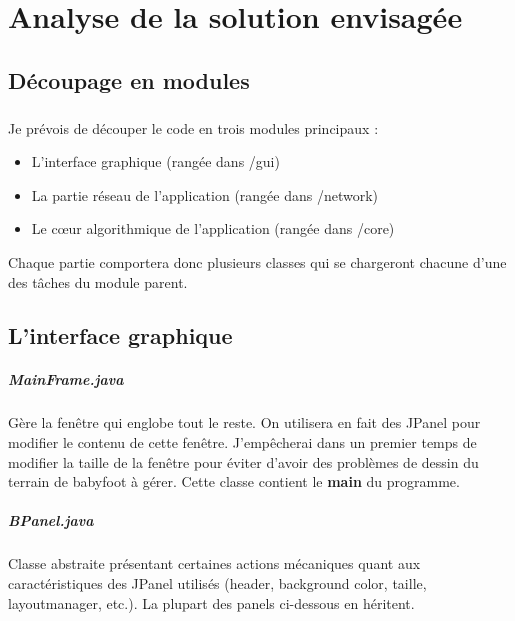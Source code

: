 \documentclass[a4paper,12pt]{report}
\begin{document}
\chapter{Analyse de la solution envisagée}


\section{Découpage en modules}
\paragraph{}
Je prévois de découper le code en trois modules principaux : 
\begin{itemize}
    \item L'interface graphique (rangée dans /gui)
    \item La partie réseau de l'application (rangée dans /network)
    \item Le c\oe{}ur algorithmique de l'application (rangée dans /core)
\end{itemize}
Chaque partie comportera donc plusieurs classes qui se chargeront chacune d'une des tâches du module parent.


\section{L'interface graphique}
\paragraph{MainFrame.java}
Gère la fenêtre qui englobe tout le reste. On utilisera en fait des JPanel pour modifier le contenu de cette fenêtre. J'empêcherai dans un premier temps de modifier la taille de la fenêtre pour éviter d'avoir des problèmes de dessin du terrain de babyfoot à gérer. Cette classe contient le \textbf{main} du programme.
\paragraph{BPanel.java}
Classe abstraite présentant certaines actions mécaniques quant aux caractéristiques des JPanel utilisés (header, background color, taille, layoutmanager, etc.). La plupart des panels ci-dessous en héritent.
\end{document}
